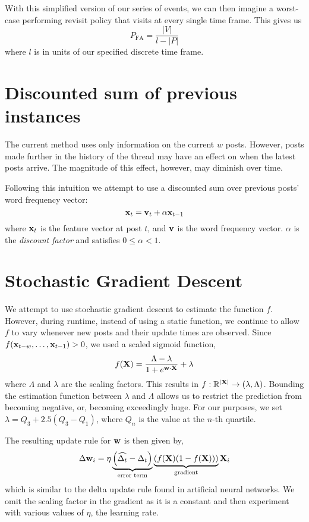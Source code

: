 With this simplified version of our series of events, we can then imagine a 
worst-case performing revisit policy that visits at every single time frame.  
This gives us
\[
	P_{\text{FA}} = \frac{|V|}{l - |P|}
\]
where $l$ is in units of our specified discrete time frame.

\section{Discounted sum of previous instances}

The current method uses only information on the current $w$ posts. However, posts made further in the history of the thread may have an effect on when the latest posts arrive. The magnitude of this effect, however, may diminish over time.

Following this intuition we attempt to use a discounted sum over previous posts' word frequency vector:
\[
	\mathbf{x}_t = \mathbf{v}_t + \alpha \mathbf{x}_{t-1}
\]
where $\mathbf{x}_t$ is the feature vector at post $t$, and $\mathbf{v}$ is the word frequency vector. $\alpha$ is the \emph{discount factor} and satisfies $0 \leq \alpha < 1$.

\section{Stochastic Gradient Descent}

We attempt to use stochastic gradient descent to estimate the function $f$. However, during runtime, instead of using a static function, we continue to allow $f$ to vary whenever new posts and their update times are observed.
Since $f(\mathbf{x}_{t-w},\hdots,\mathbf{x}_{t-1}) > 0$, we used a scaled sigmoid function,
\[
	f(\mathbf{X}) = \frac{\Lambda-\lambda}{1 + e^{\mathbf{w} \cdot \mathbf{X}}} + \lambda
\]
where $\Lambda$ and $\lambda$ are the scaling factors. This results in $f: \mathbb{R}^{|\mathbf{X}|}  \rightarrow (\lambda,\Lambda)$. Bounding the estimation function between $\lambda$ and $\Lambda$ allows us to restrict the prediction from becoming negative, or, becoming exceedingly huge. For our purposes, we set $\lambda = Q_3 + 2.5(Q_{3} - Q_{1})$, where $Q_n$ is the value at the $n$-th quartile. 

The resulting update rule for $\mathbf{w}$ is then given by,
\[
	\Delta \mathbf{w}_i = \eta
				\underbrace{\left(\widehat{\Delta_t} - \Delta_t \right)}_{\text{error term}}
				\underbrace{\left( f(\mathbf{X})(1-f(\mathbf{X})) \right)}_{\text{gradient}}
						\mathbf{X}_i
\]
which is similar to the delta update rule found in artificial neural networks. We omit the scaling factor in the gradient as it is a constant and then experiment with various values of $\eta$, the learning rate. 

